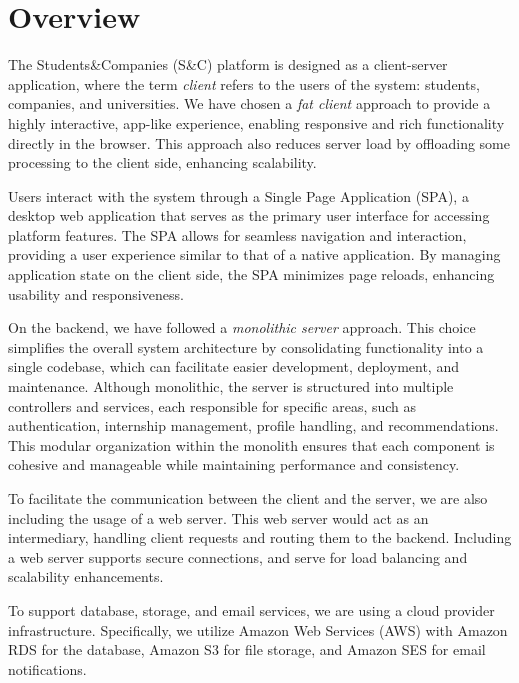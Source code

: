 \section{Overview}

The Students\&Companies (S\&C) platform is designed as a client-server application, where the term \textit{client} refers to the users of the system: students, companies, and universities. We have chosen a \textit{fat client} approach to provide a highly interactive, app-like experience, enabling responsive and rich functionality directly in the browser. This approach also reduces server load by offloading some processing to the client side, enhancing scalability.

Users interact with the system through a Single Page Application (SPA), a desktop web application that serves as the primary user interface for accessing platform features. The SPA allows for seamless navigation and interaction, providing a user experience similar to that of a native application. By managing application state on the client side, the SPA minimizes page reloads, enhancing usability and responsiveness.

On the backend, we have followed a \textit{monolithic server} approach. This choice simplifies the overall system architecture by consolidating functionality into a single codebase, which can facilitate easier development, deployment, and maintenance. Although monolithic, the server is structured into multiple controllers and services, each responsible for specific areas, such as authentication, internship management, profile handling, and recommendations. This modular organization within the monolith ensures that each component is cohesive and manageable while maintaining performance and consistency.

To facilitate the communication between the client and the server, we are also including the usage of a web server. This web server would act as an intermediary, handling client requests and routing them to the backend. Including a web server supports secure connections, and serve for load balancing and scalability enhancements.

To support database, storage, and email services, we are using a cloud provider infrastructure. Specifically, we utilize Amazon Web Services (AWS) with Amazon RDS for the database, Amazon S3 for file storage, and Amazon SES for email notifications.

